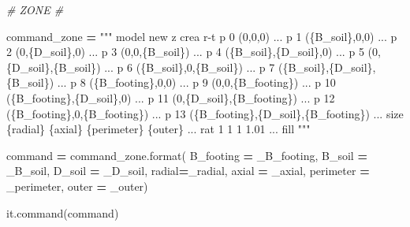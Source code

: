 \documentclass[a4paper, nobind]{templates/ociamthesis}
\newenvironment{Shaded}{\begin{snugshade}}{\end{snugshade}}
\newcommand{\BuiltInTok}[1]{#1}
\newcommand{\CommentTok}[1]{\textcolor[rgb]{0.56,0.35,0.01}{\textit{#1}}}
\newcommand{\NormalTok}[1]{#1}
\newcommand{\OperatorTok}[1]{\textcolor[rgb]{0.81,0.36,0.00}{\textbf{#1}}}
\newcommand{\SpecialCharTok}[1]{\textcolor[rgb]{0.00,0.00,0.00}{#1}}
\newcommand{\StringTok}[1]{\textcolor[rgb]{0.31,0.60,0.02}{#1}}
\renewenvironment{Shaded}
{
  \vspace{10pt}%
  \begin{snugshade}%
}{%
  \end{snugshade}%
  \vspace{8pt}%
}
\begin{document}
\begin{Shaded}
\begin{Highlighting}[]
\CommentTok{\# ZONE \#}

\NormalTok{command\_zone }\OperatorTok{=} \StringTok{"""}
\StringTok{model new}
\StringTok{z crea r{-}t p 0 (0,0,0) ...}
\StringTok{           p 1 (}\SpecialCharTok{\{B\_soil\}}\StringTok{,0,0) ...}
\StringTok{           p 2 (0,}\SpecialCharTok{\{D\_soil\}}\StringTok{,0) ...}
\StringTok{           p 3 (0,0,}\SpecialCharTok{\{B\_soil\}}\StringTok{) ...}
\StringTok{           p 4 (}\SpecialCharTok{\{B\_soil\}}\StringTok{,}\SpecialCharTok{\{D\_soil\}}\StringTok{,0) ...}
\StringTok{           p 5 (0,}\SpecialCharTok{\{D\_soil\}}\StringTok{,}\SpecialCharTok{\{B\_soil\}}\StringTok{) ...}
\StringTok{           p 6 (}\SpecialCharTok{\{B\_soil\}}\StringTok{,0,}\SpecialCharTok{\{B\_soil\}}\StringTok{) ...}
\StringTok{           p 7 (}\SpecialCharTok{\{B\_soil\}}\StringTok{,}\SpecialCharTok{\{D\_soil\}}\StringTok{,}\SpecialCharTok{\{B\_soil\}}\StringTok{) ...}
\StringTok{           p 8 (}\SpecialCharTok{\{B\_footing\}}\StringTok{,0,0) ...}
\StringTok{           p 9 (0,0,}\SpecialCharTok{\{B\_footing\}}\StringTok{) ...}
\StringTok{           p 10 (}\SpecialCharTok{\{B\_footing\}}\StringTok{,}\SpecialCharTok{\{D\_soil\}}\StringTok{,0) ...}
\StringTok{           p 11 (0,}\SpecialCharTok{\{D\_soil\}}\StringTok{,}\SpecialCharTok{\{B\_footing\}}\StringTok{) ...}
\StringTok{           p 12 (}\SpecialCharTok{\{B\_footing\}}\StringTok{,0,}\SpecialCharTok{\{B\_footing\}}\StringTok{) ...}
\StringTok{           p 13 (}\SpecialCharTok{\{B\_footing\}}\StringTok{,}\SpecialCharTok{\{D\_soil\}}\StringTok{,}\SpecialCharTok{\{B\_footing\}}\StringTok{) ...}
\StringTok{           size }\SpecialCharTok{\{radial\}}\StringTok{ }\SpecialCharTok{\{axial\}}\StringTok{ }\SpecialCharTok{\{perimeter\}}\StringTok{ }\SpecialCharTok{\{outer\}}\StringTok{ ...}
\StringTok{           rat 1 1 1 1.01 ...}
\StringTok{           fill}
\StringTok{"""}

\NormalTok{command }\OperatorTok{=}\NormalTok{ command\_zone.}\BuiltInTok{format}\NormalTok{(}
\NormalTok{B\_footing }\OperatorTok{=}\NormalTok{ \_B\_footing,}
\NormalTok{B\_soil }\OperatorTok{=}\NormalTok{ \_B\_soil,}
\NormalTok{D\_soil }\OperatorTok{=}\NormalTok{ \_D\_soil,}
\NormalTok{radial}\OperatorTok{=}\NormalTok{\_radial,}
\NormalTok{axial }\OperatorTok{=}\NormalTok{ \_axial,}
\NormalTok{perimeter }\OperatorTok{=}\NormalTok{ \_perimeter,}
\NormalTok{outer }\OperatorTok{=}\NormalTok{ \_outer)}

\NormalTok{it.command(command)}
\end{Highlighting}
\end{Shaded}
\end{document}
